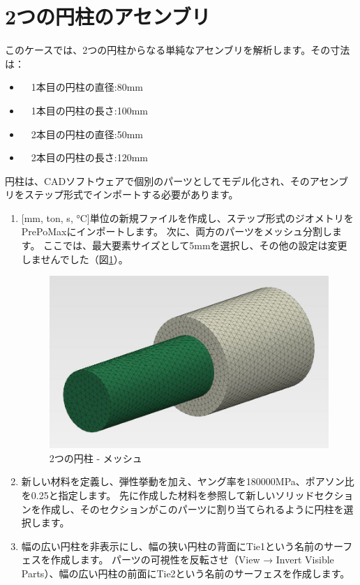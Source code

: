 \section{2つの円柱のアセンブリ}
このケースでは、2つの円柱からなる単純なアセンブリを解析します。その寸法は：
\begin{itemize}
\item　1本目の円柱の直径:80mm
\item　1本目の円柱の長さ:100mm
\item　2本目の円柱の直径:50mm
\item　2本目の円柱の長さ:120mm
\end{itemize}
円柱は、CADソフトウェアで個別のパーツとしてモデル化され、そのアセンブリをステップ形式でインポートする必要があります。
\begin{enumerate}
\item
  {[}mm, ton, s, °C{]}単位の新規ファイルを作成し、ステップ形式のジオメトリをPrePoMaxにインポートします。
  次に、両方のパーツをメッシュ分割します。
  ここでは、最大要素サイズとして5mmを選択し、その他の設定は変更しませんでした（図\ref{fig:05-01}）。
	\begin{figure}[H]
	\centering
	\includegraphics[width=120mm]{fig/05-01.png}
	\caption{2つの円柱 - メッシュ}
	\label{fig:05-01}
	\end{figure}
\vspace{-\baselineskip}
\item
  新しい材料を定義し、弾性挙動を加え、ヤング率を180000MPa、ポアソン比を0.25と指定します。
  先に作成した材料を参照して新しいソリッドセクションを作成し、そのセクションがこのパーツに割り当てられるように円柱を選択します。
\item
  幅の広い円柱を非表示にし、幅の狭い円柱の背面にTie1という名前のサーフェスを作成します。
  パーツの可視性を反転させ（View → Invert Visible Parts）、幅の広い円柱の前面にTie2という名前のサーフェスを作成します。

\end{enumerate}
